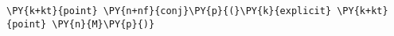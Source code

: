 \begin{Verbatim}[commandchars=\\\{\}]
    \PY{k+kt}{point} \PY{n+nf}{conj}\PY{p}{(}\PY{k}{explicit} \PY{k+kt}{point} \PY{n}{M}\PY{p}{)}
\end{Verbatim}
